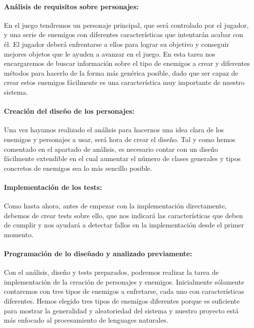 \paragraph{Análisis de requisitos sobre personajes:} En el juego tendremos un personaje principal, que será controlado por el jugador, y una serie de enemigos con diferentes características que intentarán acabar con él. El jugador deberá enfrentarse a ellos para lograr su objetivo y conseguir mejores objetos que le ayuden a avanzar en el juego. En esta tarea nos encargaremos de buscar información sobre el tipo de enemigos a crear y diferentes métodos para hacerlo de la forma más genérica posible, dado que ser capaz de crear estos enemigos fácilmente es una característica muy importante de nuestro sistema.

\paragraph{Creación del diseño de los personajes:} Una vez hayamos realizado el análisis para hacernos una idea clara de los enemigos y personajes a usar, será hora de crear el diseño. Tal y como hemos comentado en el apartado de análisis, es necesario contar con un diseño fácilmente extendible en el cual aumentar el número de clases generales y tipos concretos de enemigos sea lo más sencillo posible.

\paragraph{Implementación de los tests:} Como hasta ahora, antes de empezar con la implementación directamente, debemos de crear tests sobre ello, que nos indicará las características que deben de cumplir y nos ayudará a detectar fallos en la implementación desde el primer momento.

\paragraph{Programación de lo diseñado y analizado previamente:} Con el análisis, diseño y tests preparados, podremos realizar la tarea de implementación de la creación de personajes y enemigos. Inicialmente sólamente contaremos con tres tipos de enemigos a enfretarse, cada uno con características diferentes. Hemos elegido tres tipos de enemigos diferentes porque es suficiente para mostrar la generalidad y aleatoriedad del sistema y nuestro proyecto está más enfocado al procesamiento de lenguages naturales.

